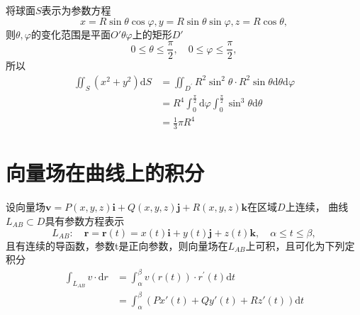 \documentclass[lang=cn,10pt]{elegantbook}
\newcommand\bv[1]{\boldsymbol{#1}}
\begin{document}
\begin{solution}
    将球面$S$表示为参数方程
    \begin{equation*}
        x=R\sin\theta\cos\varphi,y=R\sin\theta\sin\varphi,z=R\cos\theta,
    \end{equation*}
    则$\theta,\varphi$的变化范围是平面$O'\theta\varphi$上的矩形$D'$
    \begin{equation*}
        0\leqslant\theta\leqslant\frac{\pi}{2},\quad0\leqslant\varphi\leqslant\frac{\pi}{2},
    \end{equation*}
    所以
    \begin{equation*}
        \begin{aligned}
            \iint_{S}(x^{2}+y^{2})\mathrm{d}S
             & =\iint_{D^{\prime}}R^2\sin^2\theta\cdot R^2\sin\theta\mathrm{d}\theta\mathrm{d}\varphi \\
             & =R^4\int_0^{\frac\pi2}\mathrm{d}\varphi\int_0^{\frac\pi2}\sin^3\theta\mathrm{d}\theta  \\
             & =\frac{1}{3}\pi R^4
        \end{aligned}
    \end{equation*}
\end{solution}

\section{向量场在曲线上的积分}
\begin{theorem}
    设向量场$\bv{v}=P(x,y,z)\boldsymbol{i}+Q(x,y,z)\boldsymbol{j}+R(x,y,z)\boldsymbol{k}$在区域$D$上连续，
    曲线$L_{AB} \subset D$具有参数方程表示
    \begin{equation}
        L_{AB}:\quad\boldsymbol{r}=\boldsymbol{r}(t)=x(t)\boldsymbol{i}+y(t)\boldsymbol{j}+z(t)\boldsymbol{k},
        \quad\alpha\leqslant t\leqslant\beta,
    \end{equation}
    且有连续的导函数，参数t是正向参数，则向量场在$L_{AB}$上可积，且可化为下列定积分
    \begin{equation}
        \begin{aligned}
            \int_{L_{AB}}v\cdot\mathrm{d}r
             & =\int_{\alpha}^{\beta}v(r(t))\cdot r^{\prime}(t)\mathrm{d}t \\
             & =\int_{\alpha}^{\beta}(Px'(t)+Qy'(t)+Rz'(t))\mathrm{d}t
        \end{aligned}
    \end{equation}
\end{theorem}
\end{document}

